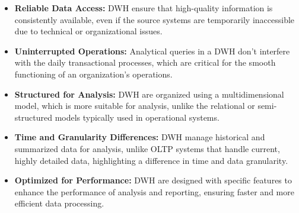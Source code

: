 \documentclass[conference]{IEEEtran}
\begin{document}
	\begin{itemize}[leftmargin=1cm]
		\item \textbf{Reliable Data Access:} DWH ensure that high-quality information is consistently available, even if the source systems are temporarily inaccessible due to technical or organizational issues.
		
		\item \textbf{Uninterrupted Operations:} Analytical queries in a DWH don't interfere with the daily transactional processes, which are critical for the smooth functioning of an organization's operations.
		
		\item \textbf{Structured for Analysis:} DWH are organized using a multidimensional model, which is more suitable for analysis, unlike the relational or semi-structured models typically used in operational systems.
		
		\item \textbf{Time and Granularity Differences:} DWH manage historical and summarized data for analysis, unlike OLTP systems that handle current, highly detailed data, highlighting a difference in time and data granularity.
		
		\item \textbf{Optimized for Performance:} DWH are designed with specific features to enhance the performance of analysis and reporting, ensuring faster and more efficient data processing.
	\end{itemize}
	
	
\end{document}
